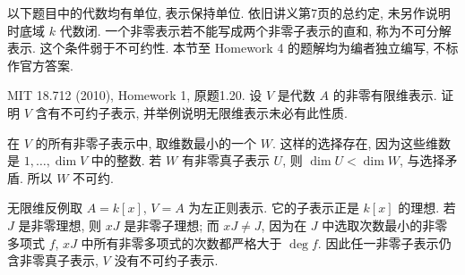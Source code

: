 
以下题目中的代数均有单位, 表示保持单位. 依旧讲义第7页的总约定, 未另作说明时底域 $k$ 代数闭. 一个非零表示若不能写成两个非零子表示的直和, 称为不可分解表示. 这个条件弱于不可约性. 本节至 Homework 4 的题解均为编者独立编写, 不标作官方答案.

\begin{exercise}\label{hw:1.20}
MIT 18.712 (2010), Homework 1, 原题1.20. 设 $V$ 是代数 $A$ 的非零有限维表示. 证明 $V$ 含有不可约子表示, 并举例说明无限维表示未必有此性质.
\end{exercise}
\begin{solution}
在 $V$ 的所有非零子表示中, 取维数最小的一个 $W$. 这样的选择存在, 因为这些维数是 $1,\ldots,\dim V$ 中的整数. 若 $W$ 有非零真子表示 $U$, 则 $\dim U<\dim W$, 与选择矛盾. 所以 $W$ 不可约.

无限维反例取 $A=k[x]$, $V=A$ 为左正则表示. 它的子表示正是 $k[x]$ 的理想. 若 $J$ 是非零理想, 则 $xJ$ 是非零子理想; 而 $xJ\ne J$, 因为在 $J$ 中选取次数最小的非零多项式 $f$, $xJ$ 中所有非零多项式的次数都严格大于 $\deg f$. 因此任一非零子表示仍含非零真子表示, $V$ 没有不可约子表示.
\end{solution}

